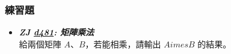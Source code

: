 \subsubsection*{練習題}
\begin{itemize}[label={\Checkmark}]
\item \textbf{\textit{ZJ \href{http://zerojudge.tw/ShowProblem?problemid=d481}{d481}: 矩陣乘法}}\\
給兩個矩陣 $A$、$B$，若能相乘，請輸出 $A	imes{B}$ 的結果。
\end{itemize}